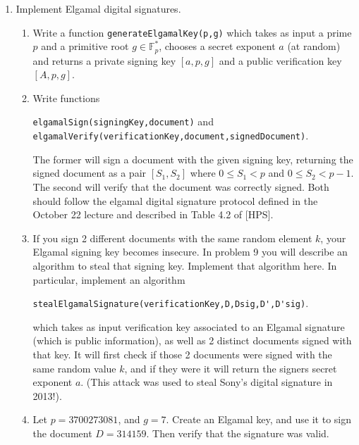 \documentclass[11pt]{article}
\newcommand{\bF}{\mathbb{F}}
\begin{document}
\begin{enumerate}
{\begin{enumerate}
{    \newpage
    $D'^{sig} =\\ \seqsplit{%
    90592809313509991477767898543561252818730285233946708276918316631997361944737647286633671059236656863128827269012547659105911490655257488384426092740746945829967538162116044915055692244129577771297348901913124079826581655154147415714324848399155672059930064485203220452985824881282662030076919344957027591627}$\\
    Which message is truthful?
    }
  \end{enumerate}
  }
  \item{
  Implement Elgamal digital signatures.
  \begin{enumerate}
    \item{
    Write a function \verb|generateElgamalKey(p,g)| which takes as input a prime $p$ and a primitive root $g\in\bF_p^*$, chooses a secret exponent $a$ (at random) and returns a private signing key $[a,p,g]$ and a public verification key $[A,p,g]$.
    }
    \item{
    Write functions \begin{center}\verb|elgamalSign(signingKey,document)| and \verb|elgamalVerify(verificationKey,document,signedDocument)|.\end{center}
    The former will sign a document with the given signing key, returning the signed document as a pair $[S_1,S_2]$ where $0\le S_1<p$ and $0\le S_2<p-1$.  The second will verify that the document was correctly signed.  Both should follow the elgamal digital signature protocol defined in the October 22 lecture and described in Table 4.2 of [HPS].
    }
    \item{
    If you sign 2 different documents with the same random element $k$, your Elgamal signing key becomes insecure.  In problem 9 you will describe an algorithm to steal that signing key.  Implement that algorithm here.  In particular, implement an algorithm
    \begin{center}
      \verb|stealElgamalSignature(verificationKey,D,Dsig,D',D'sig)|.
    \end{center}
    which takes as input verification key associated to an Elgamal signature (which is public information), as well as 2 distinct documents signed with that key.  It will first check if those 2 documents were signed with the same random value $k$, and if they were it will return the signers secret exponent $a$.  (This attack was used to steal Sony's digital signature in 2013!).
    }
    \item{
    Let $p=3700273081$, and $g=7$.  Create an Elgamal key, and use it to sign the document $D = 314159$.  Then verify that the signature was valid.
}
\end{enumerate}}
\end{enumerate}
\end{document}
